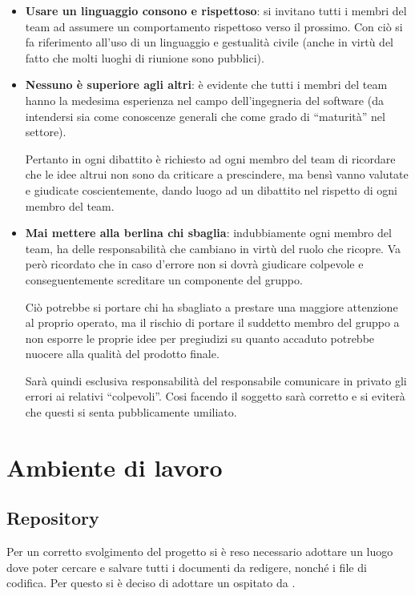 \begin{itemize}
	\item \textbf{Usare un linguaggio consono e rispettoso}: si invitano tutti i membri del team ad assumere un comportamento rispettoso verso il prossimo. Con ciò si fa riferimento all'uso di un linguaggio e gestualità civile (anche in virtù del fatto che molti luoghi di riunione sono pubblici).
	\item \textbf{Nessuno è superiore agli altri}: è evidente che tutti i membri del team hanno la medesima esperienza nel campo dell'ingegneria del software (da intendersi sia come conoscenze generali che come grado di ``maturità'' nel settore).
	
Pertanto in ogni dibattito  è richiesto ad ogni membro del team di ricordare che le idee altrui non sono da criticare a prescindere, ma bensì vanno valutate e giudicate coscientemente, dando luogo ad un dibattito nel rispetto di ogni membro del team.
	\item \textbf{Mai mettere alla berlina chi sbaglia}: indubbiamente ogni membro del team, ha delle responsabilità che cambiano in virtù del ruolo che ricopre. Va però ricordato che in caso d'errore non si dovrà giudicare colpevole e conseguentemente screditare un componente del gruppo.
	
Ciò potrebbe si portare chi ha sbagliato a prestare una maggiore attenzione al proprio operato, ma il rischio di  portare il suddetto membro del gruppo a non esporre le proprie idee per pregiudizi su quanto accaduto potrebbe nuocere alla qualità del prodotto finale.

Sarà quindi esclusiva responsabilità del responsabile comunicare in privato gli errori ai relativi ``colpevoli''. Cosi facendo il soggetto sarà corretto e si eviterà che questi si senta pubblicamente umiliato.
\end{itemize}

\clearpage
\section{Ambiente di lavoro}
\subsection{Repository}
\label{sec:repository}
Per un corretto svolgimento del progetto si è reso necessario adottare un luogo dove poter cercare e salvare tutti i documenti da redigere, nonché i file di codifica. Per questo si è deciso di adottare un \underline{} ospitato da .

